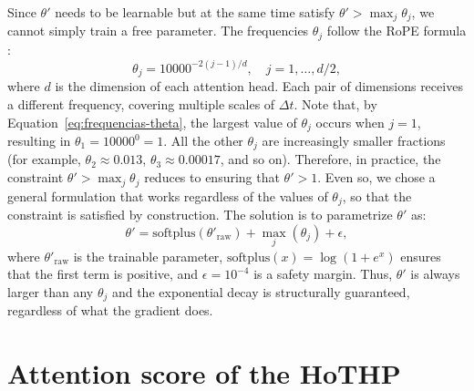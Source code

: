 Since $\theta'$ needs to be learnable but at the same time satisfy $\theta' > \max_j \theta_j$, we cannot simply train a free parameter. The frequencies $\theta_j$ follow the RoPE formula \cite{su_roformer_2023}:
%
\begin{equation}
    \theta_j = 10000^{-2(j-1)/d}, \quad j = 1, \ldots, d/2,
    \label{eq:frequencias-theta}
\end{equation}
%
where $d$ is the dimension of each attention head. Each pair of dimensions receives a different frequency, covering multiple scales of $\Delta t$. Note that, by Equation~\eqref{eq:frequencias-theta}, the largest value of $\theta_j$ occurs when $j = 1$, resulting in $\theta_1 = 10000^0 = 1$. All the other $\theta_j$ are increasingly smaller fractions (for example, $\theta_2 \approx 0.013$, $\theta_3 \approx 0.00017$, and so on). Therefore, in practice, the constraint $\theta' > \max_j \theta_j$ reduces to ensuring that $\theta' > 1$. Even so, we chose a general formulation that works regardless of the values of $\theta_j$, so that the constraint is satisfied by construction. The solution is to parametrize $\theta'$ as:
%
\begin{equation}
    \theta' = \mathrm{softplus}(\theta'_{\mathrm{raw}}) + \max_j(\theta_j) + \epsilon,
    \label{eq:theta-prime-parametrizacao}
\end{equation}
%
where $\theta'_{\mathrm{raw}}$ is the trainable parameter, $\mathrm{softplus}(x) = \log(1 + e^x)$ ensures that the first term is positive, and $\epsilon = 10^{-4}$ is a safety margin. Thus, $\theta'$ is always larger than any $\theta_j$ and the exponential decay is structurally guaranteed, regardless of what the gradient does.

\section{Attention score of the HoTHP}
\label{sec:score-atencao-hothp}

